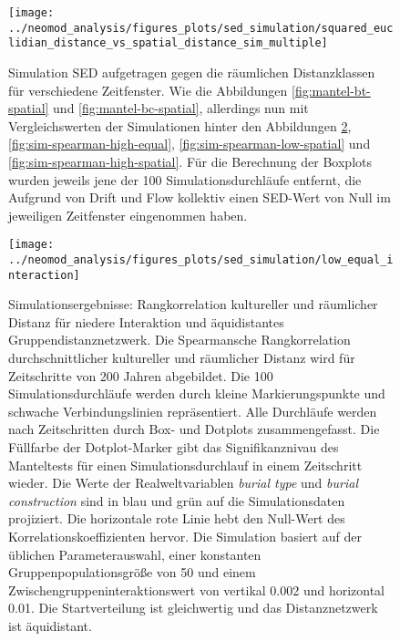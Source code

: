 \documentclass[openany,twoside,twocolumn]{book}
\begin{document}
\begin{landscape}
\begin{figure}
\texttt{[image: ../neomod\_analysis/figures\_plots/sed\_simulation/squared\_euclidian\_distance\_vs\_spatial\_distance\_sim\_multiple]} \caption[Simulation SED aufgetragen gegen die räumlichen Distanzklassen für verschiedene Zeitfenster.]{Simulation SED aufgetragen gegen die räumlichen Distanzklassen für verschiedene Zeitfenster. Wie die Abbildungen \ref{fig:mantel-bt-spatial} und \ref{fig:mantel-bc-spatial}, allerdings nun mit Vergleichswerten der Simulationen hinter den Abbildungen \ref{fig:sim-spearman-low-equal}, \ref{fig:sim-spearman-high-equal}, \ref{fig:sim-spearman-low-spatial} und \ref{fig:sim-spearman-high-spatial}. Für die Berechnung der Boxplots wurden jeweils jene der 100 Simulationsdurchläufe entfernt, die Aufgrund von Drift und Flow kollektiv einen SED-Wert von Null im jeweiligen Zeitfenster eingenommen haben.}\label{fig:sim-sed}
\end{figure}
\end{landscape}

\begin{figure}
\texttt{[image: ../neomod\_analysis/figures\_plots/sed\_simulation/low\_equal\_interaction]} \caption[Simulationsergebnisse: Rangkorrelation kultureller und räumlicher Distanz für niedere Interaktion und äquidistantes Gruppendistanznetzwerk]{Simulationsergebnisse: Rangkorrelation kultureller und räumlicher Distanz für niedere Interaktion und äquidistantes Gruppendistanznetzwerk. Die Spearmansche Rangkorrelation durchschnittlicher kultureller und räumlicher Distanz wird für Zeitschritte von 200 Jahren abgebildet. Die 100 Simulationsdurchläufe werden durch kleine Markierungspunkte und schwache Verbindungslinien repräsentiert. Alle Durchläufe werden nach Zeitschritten durch Box- und Dotplots zusammengefasst. Die Füllfarbe der Dotplot-Marker gibt das Signifikanznivau des Manteltests für einen Simulationsdurchlauf in einem Zeitschritt wieder. Die Werte der Realweltvariablen \textit{burial type} und \textit{burial construction} sind in blau und grün auf die Simulationsdaten projiziert. Die horizontale rote Linie hebt den Null-Wert des Korrelationskoeffizienten hervor. Die Simulation basiert auf der üblichen Parameterauswahl, einer konstanten Gruppenpopulationsgröße von 50 und einem Zwischengruppeninteraktionswert von vertikal 0.002 und horizontal 0.01. Die Startverteilung ist gleichwertig und das Distanznetzwerk ist äquidistant.}\label{fig:sim-spearman-low-equal}
\end{figure}
\end{document}
